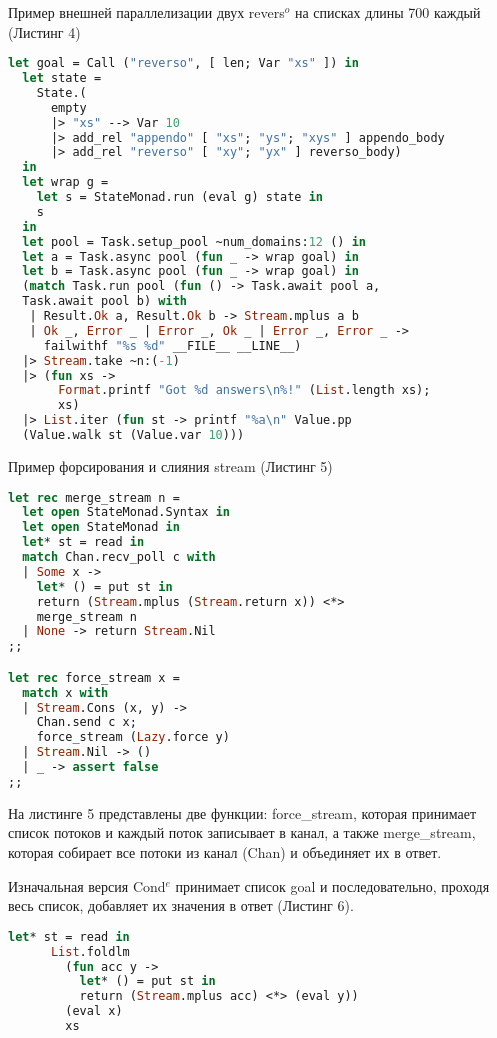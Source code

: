 Пример внешней параллелизации двух revers$^o$ на списках длины 700 каждый (Листинг 4)

\begin{lstlisting}[caption=\textbf{Параллелизация двух revers$^o$ на списках длины 700}, language=OCaml, frame=single]
  let goal = Call ("reverso", [ len; Var "xs" ]) in
  let state =
    State.(
      empty
      |> "xs" --> Var 10
      |> add_rel "appendo" [ "xs"; "ys"; "xys" ] appendo_body
      |> add_rel "reverso" [ "xy"; "yx" ] reverso_body)
  in
  let wrap g =
    let s = StateMonad.run (eval g) state in
    s
  in
  let pool = Task.setup_pool ~num_domains:12 () in
  let a = Task.async pool (fun _ -> wrap goal) in
  let b = Task.async pool (fun _ -> wrap goal) in
  (match Task.run pool (fun () -> Task.await pool a, 
  Task.await pool b) with
   | Result.Ok a, Result.Ok b -> Stream.mplus a b
   | Ok _, Error _ | Error _, Ok _ | Error _, Error _ ->
     failwithf "%s %d" __FILE__ __LINE__)
  |> Stream.take ~n:(-1)
  |> (fun xs ->
       Format.printf "Got %d answers\n%!" (List.length xs);
       xs)
  |> List.iter (fun st -> printf "%a\n" Value.pp 
  (Value.walk st (Value.var 10)))
\end{lstlisting}

Пример форсирования и слияния stream (Листинг 5)

\begin{lstlisting}[caption=\textbf{Форсирования и слияния stream}, language=OCaml, frame=single]
  let rec merge_stream n =
  let open StateMonad.Syntax in
  let open StateMonad in
  let* st = read in
  match Chan.recv_poll c with
  | Some x ->
    let* () = put st in
    return (Stream.mplus (Stream.return x)) <*> 
    merge_stream n
  | None -> return Stream.Nil
;;

let rec force_stream x =
  match x with
  | Stream.Cons (x, y) ->
    Chan.send c x;
    force_stream (Lazy.force y)
  | Stream.Nil -> ()
  | _ -> assert false
;;
\end{lstlisting}

На листинге 5 представлены две функции: force\_stream, которая принимает список потоков и каждый поток записывает в канал, а также 
merge\_stream, которая собирает все потоки из канал (Chan) и объединяет их в ответ.

Изначальная версия Cond$^e$ принимает список goal и последовательно, проходя весь список, добавляет их значения в ответ (Листинг 6).


\begin{lstlisting}[caption=\textbf{Изначальная реализация Сond$^e$}, language=OCaml, frame=single]
  let* st = read in
      List.foldlm
        (fun acc y ->
          let* () = put st in
          return (Stream.mplus acc) <*> (eval y))
        (eval x)
        xs
\end{lstlisting}

